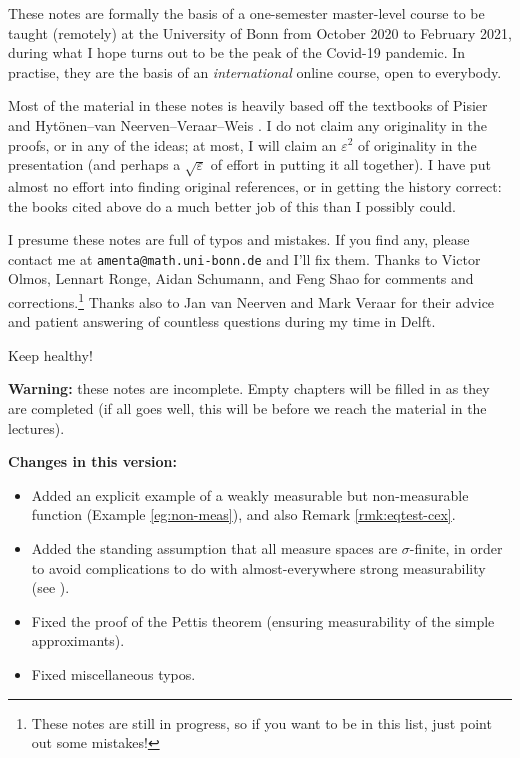 These notes are formally the basis of a one-semester master-level course to be taught (remotely) at the University of Bonn from October 2020 to February 2021, during what I hope turns out to be the peak of the Covid-19 pandemic.
In practise, they are the basis of an \emph{international} online course, open to everybody.

Most of the material in these notes is heavily based off the textbooks of Pisier \cite{gP16} and Hyt\"onen--van Neerven--Veraar--Weis \cite{HNVW16, HNVW17}.
I do not claim any originality in the proofs, or in any of the ideas; at most, I will claim an $\varepsilon^2$ of originality in the presentation (and perhaps a $\sqrt{\varepsilon}$ of effort in putting it all together).
I have put almost no effort into finding original references, or in getting the history correct: the books cited above do a much better job of this than I possibly could.

\vspace{1cm}

I presume these notes are full of typos and mistakes.
If you find any, please contact me at \texttt{amenta@math.uni-bonn.de} and I'll fix them.
Thanks to Victor Olmos, Lennart Ronge, Aidan Schumann, and Feng Shao for comments and corrections.\footnote{These notes are still in progress, so if you want to be in this list, just point out some mistakes!}
Thanks also to Jan van Neerven and Mark Veraar for their advice and patient answering of countless questions during my time in Delft. 

\vspace{1cm}

Keep healthy! 




\vspace{2cm}

\textbf{Warning:} these notes are incomplete.
Empty chapters will be filled in as they are completed (if all goes well, this will be before we reach the material in the lectures).

\textbf{Changes in this version:}
\begin{itemize}
\item Added an explicit example of a weakly measurable but non-measurable function (Example \ref{eg:non-meas}), and also Remark \ref{rmk:eqtest-cex}.
\item Added the standing assumption that all measure spaces are $\sigma$-finite, in order to avoid complications to do with almost-everywhere strong measurability (see \cite[Section 1.1.b]{HNVW16}).
\item Fixed the proof of the Pettis theorem (ensuring measurability of the simple approximants).
\item Fixed miscellaneous typos.
\end{itemize}





